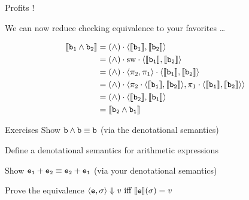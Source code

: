 \documentclass{beamer}
\begin{document}
\begin{frame}{Profits !}
        
        We can now reduce checking equivalence to your favorites \dots
        \begin{center}
        \end{center}
        
        \pause
        \begin{example}
        \small{
        \vspace{-0.2cm}
        \begin{align*}
                \llbracket \mathtt{b_1} \wedge \mathtt{b_2} \rrbracket & =
                (\wedge) \cdot \langle \llbracket \mathtt{b_1} \rrbracket, \llbracket \mathtt{b_2} \rrbracket \rangle
                \\
                                                   & = (\wedge) \cdot \mathrm{sw}
                                                   \cdot 
                                                   \langle \llbracket \mathtt{b_1} \rrbracket, \llbracket \mathtt{b_2} \rrbracket \rangle
                                                   \\
                                                   & = (\wedge) \cdot \langle \pi_2, \pi_1 \rangle
                                                   \cdot 
                                                   \langle \llbracket \mathtt{b_1} \rrbracket, \llbracket \mathtt{b_2} \rrbracket \rangle
                                                   \\
                                                   & = (\wedge) \cdot \langle \pi_2
                                                   \cdot \langle \llbracket \mathtt{b_1} \rrbracket, 
                                                   \llbracket \mathtt{b_2} \rrbracket \rangle, \pi_1
                                                   \cdot \langle \llbracket \mathtt{b_1} \rrbracket, \llbracket \mathtt{b_2} \rrbracket \rangle \rangle
                                                   \\
                                                   & = (\wedge) \cdot 
                                                   \langle \llbracket \mathtt{b_2} \rrbracket, \llbracket \mathtt{b_1} \rrbracket \rangle
                                                   \\
                                                   & = \llbracket \mathtt{b_2} \wedge \mathtt{b_1} \rrbracket
         \end{align*}
        }
        \end{example}
\end{frame}


\begin{frame}{Exercises}
                Show $\mathtt{b} \wedge \mathtt{b} \equiv \mathtt{b}$ (via the
                denotational semantics)
 
                Define a denotational semantics for arithmetic expressions 

                Show $\mathtt{e_1} + \mathtt{e_2} \equiv \mathtt{e_2} + \mathtt{e_1}$
                (via your denotational semantics)

                Prove the equivalence $\langle \mathtt{e}, \sigma \rangle \Downarrow v
                \text{ iff } \llbracket \mathtt{e} \rrbracket(\sigma) = v$
\end{frame}
\end{document}
